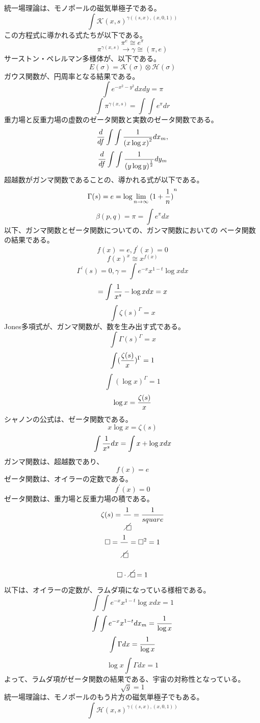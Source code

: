 \documentclass{jsarticle}
\begin{document}
  統一場理論は、モノポールの磁気単極子である。
  $$ \int {\mathcal{K}(x,s)}^{\gamma((s,x),(x,0,1))} $$
  この方程式に導かれる式たちが以下である。
  $$ \pi^{e} \cong e^{\pi} $$
  $$ \pi^{\gamma(x,s)} \to \gamma \cong (\pi,e) $$
  サーストン・ペレルマン多様体が、以下である。
  $$ E(\sigma) = \mathcal{K}(\sigma) \otimes \mathcal{H}(\sigma) $$
  ガウス関数が、円周率となる結果である。
  $$ \int e^{-x^2 - y^2}dxdy = \pi $$
  $$ \int \pi^{\gamma(x,s)} = \int \int e^{\pi}dr $$
  重力場と反重力場の虚数のゼータ関数と実数のゼータ関数である。
  $$ {d \over {d f}}\int\int {1 \over {(x\log x)}^{2}}dx_m, $$
  $$ {d \over {d f}}\int\int {1 \over {(y \log y)}^{1 \over 2}}dy_m $$
  超越数がガンマ関数であることの、導かれる式が以下である。
  $$ \Gamma(s) = e = \log {\lim_{n\to \infty}{(1 + {1 \over n})}^{n}}  $$
  $$ \beta(p,q) = \pi = \int e^{\pi}dx $$
  以下、ガンマ関数とゼータ関数についての、ガンマ関数においての
  ベータ関数の結果である。
  $$ f(x) = e, f^{'}(x) = 0 $$
  $$ {f(x)}^{x} \cong x^{f(x)} $$
  $$ \Gamma^{'}(s) = 0, \gamma = \int e^{-x}x^{1 - t} \log x dx $$
  $$ = \int{{1 \over x^{s}} - \log x}dx = x $$
  $$ \int {\zeta(s)}^{\Gamma} = x $$
  Jones多項式が、ガンマ関数が、数を生み出す式である。
  $$ \int {\Gamma(s)}^{\Gamma} = x $$
  $$ \int ({{\zeta(s)} \over {x}})^{\Gamma} = 1 $$
  $$ \int {(\log x)}^{\Gamma} = 1 $$
  $$ \log x = {{\zeta(s)} \over {x}} $$
  シャノンの公式は、ゼータ関数である。
  $$ x\log x = \zeta(s) $$
  $$ \int {1 \over {x^s}}dx = \int x + \log x dx $$
  ガンマ関数は、超越数であり、
  $$ f(x) = e $$
  ゼータ関数は、オイラーの定数である。
  $$ f^{'}(x) = 0 $$
  ゼータ関数は、重力場と反重力場の積である。
  $$ \zeta(s) = {1 \over {\alearletter}} = {1 \over {square}} $$
  $$ \square = {1 \over {\alearletter}} = \square^{2} = 1 $$
  $$ \square \cdot \alearletter = 1 $$
  以下は、オイラーの定数が、ラムダ項になっている様相である。
  $$ \int\int e^{-x}x^{1 - t}\log x dx = 1 $$
  $$ \int\int e^{-x} x^{1 - t}dx_m = {1 \over {\log x}} $$
  $$ \int \Gamma dx = {1 \over {\log x}} $$
  $$ \log x \int \Gamma dx = 1 $$
  よって、ラムダ項がゼータ関数の結果である、宇宙の対称性となっている。
  $$ \sqrt{g} = 1 $$
   統一場理論は、モノポールのもう片方の磁気単極子でもある。
  $$ \int {\mathcal{H}(x,s)}^{\gamma((s,x),(x,0,1))} $$
\end{document}
